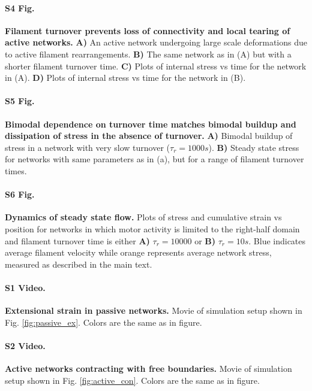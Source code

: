 \documentclass[10pt,letterpaper]{article}
\begin{document}
\paragraph*{S4 Fig.}
\label{fig:active_tear}
{\bf  Filament turnover prevents loss of connectivity and local tearing of active networks.}  \textbf{A)}  An active network undergoing large scale deformations due to active filament rearrangements.  \textbf{B)}  The same network as in (A) but with a shorter filament turnover time.  \textbf{C)}  Plots of internal stress vs time for the network in (A).  \textbf{D)}  Plots of internal stress vs time for the network in (B).  


\paragraph*{S5 Fig.}
\label{fig:recycle_supp}
{\bf Bimodal dependence on turnover time matches bimodal buildup and dissipation of stress in the absence of turnover.}   \textbf{A)}  Bimodal buildup of stress in a network with very slow turnover ($\tau_r = 1000s$).  \textbf{B)}  Steady state stress for networks with same parameters as in (a), but  for a range of filament turnover times.   

\paragraph*{S6 Fig.}
\label{fig:combo_prof}
{\bf  Dynamics of steady state flow.}  Plots of stress and cumulative strain vs position for networks in which motor activity is limited to the right-half domain and filament turnover time is either  \textbf{A)} $\tau_r = 10000$ or  \textbf{B)} $\tau_r = 10 s$.  Blue indicates average filament velocity while orange represents average network stress, measured as described in the main text. 


\paragraph*{S1 Video.}
\label{passive_ex_video}
{\bf Extensional strain in passive networks.}  Movie of simulation setup shown in Fig. \ref{fig:passive_ex}.  Colors are the same as in figure.

\paragraph*{S2 Video.}
\label{active_con_video}
{\bf Active networks contracting with free boundaries.}  Movie of simulation setup shown in Fig. \ref{fig:active_con}.  Colors are the same as in figure.
\end{document}
